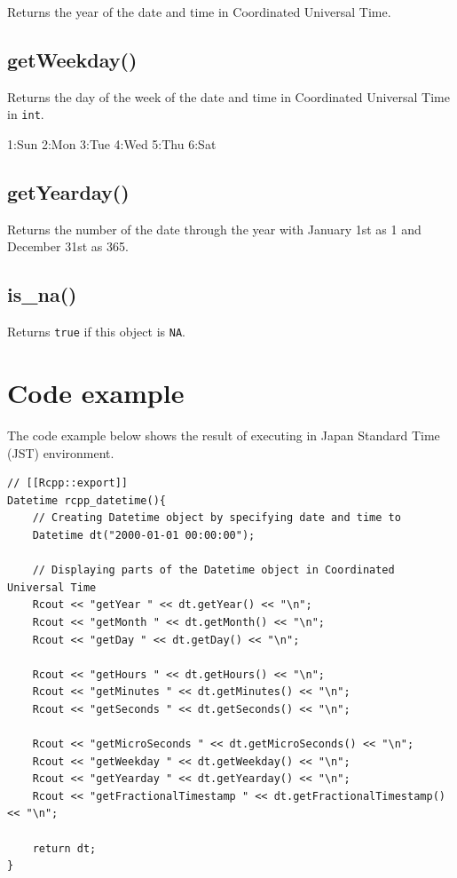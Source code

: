 \documentclass[]{book}
\theoremstyle{definition}
\theoremstyle{definition}
\theoremstyle{remark}
\begin{document}
Returns the year of the date and time in Coordinated Universal Time.

\subsection{getWeekday()}\label{getweekday-1}

Returns the day of the week of the date and time in Coordinated
Universal Time in \texttt{int}.

1:Sun 2:Mon 3:Tue 4:Wed 5:Thu 6:Sat

\subsection{getYearday()}\label{getyearday-1}

Returns the number of the date through the year with January 1st as 1
and December 31st as 365.

\subsection{is\_na()}\label{is_na-1}

Returns \texttt{true} if this object is \texttt{NA}.

\section{Code example}\label{code-example-1}

The code example below shows the result of executing in Japan Standard
Time (JST) environment.

\begin{verbatim}
// [[Rcpp::export]]
Datetime rcpp_datetime(){
    // Creating Datetime object by specifying date and time to
    Datetime dt("2000-01-01 00:00:00");

    // Displaying parts of the Datetime object in Coordinated Universal Time
    Rcout << "getYear " << dt.getYear() << "\n";
    Rcout << "getMonth " << dt.getMonth() << "\n";
    Rcout << "getDay " << dt.getDay() << "\n";

    Rcout << "getHours " << dt.getHours() << "\n";
    Rcout << "getMinutes " << dt.getMinutes() << "\n";
    Rcout << "getSeconds " << dt.getSeconds() << "\n";

    Rcout << "getMicroSeconds " << dt.getMicroSeconds() << "\n";
    Rcout << "getWeekday " << dt.getWeekday() << "\n";
    Rcout << "getYearday " << dt.getYearday() << "\n";
    Rcout << "getFractionalTimestamp " << dt.getFractionalTimestamp() << "\n";

    return dt;
}
\end{verbatim}
\end{document}
